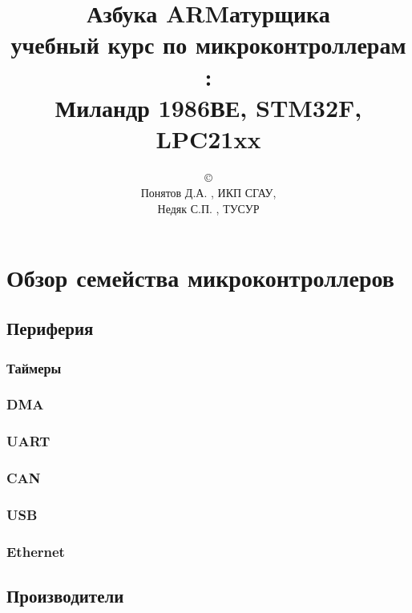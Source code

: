 



\title{\Huge{Азбука ARMатурщика}\\
\normalsize{учебный курс по микроконтроллерам \cx:\\
Миландр 1986ВЕ, STM32F, LPC21xx}}
\author{\copyright\\
Понятов Д.А. , ИКП СГАУ, \\
Недяк С.П. , ТУСУР
}
\maketitle
\tableofcontents
\listoflab

\part{Обзор семейства микроконтроллеров \cx}



\section{\cx}
\chapter{Периферия}
\section{Таймеры}
\section{DMA}
\section{UART}
\section{CAN}
\section{USB}
\section{Ethernet}
\chapter{Производители}
